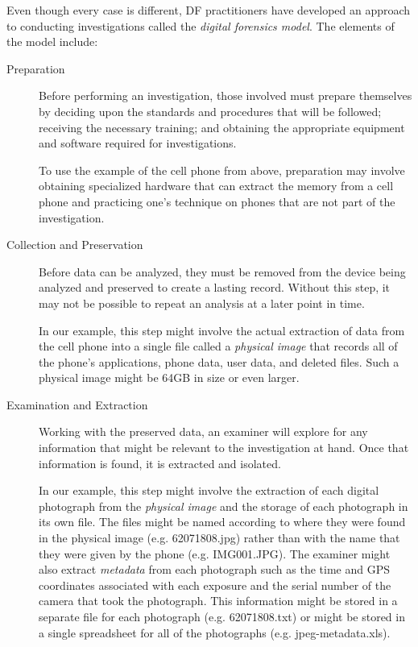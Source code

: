 Even though every case is different, DF practitioners have developed an
approach to conducting investigations called the 
\emph{digital forensics model}\cite{pollitt:models}. The 
elements of the model include:

\begin{description}
\item[Preparation] Before performing an investigation, those involved
  must prepare themselves by deciding upon the standards and
  procedures that will be followed; receiving the necessary training;
  and obtaining the appropriate equipment and software required for
  investigations. 

  To use the example of the cell phone from above,
  preparation may involve obtaining specialized hardware that can extract the
  memory from a cell phone and practicing one's technique on phones that are not part
  of the investigation.

\item[Collection and Preservation]
  Before data can be analyzed, they   must be removed from the
  device being analyzed and preserved to create a lasting
  record. Without this step, it may not be possible to repeat an
  analysis at a later point in time. 

  In our example, this step might involve the actual extraction of data
  from the cell phone into a single file called a \emph{physical
    image} that records all of the phone's applications, phone data, user data,
  and deleted files. Such a physical image might be 64GB in size or
  even larger.

\item[Examination and Extraction] Working with the preserved data, an
  examiner will explore for any information that might be
  relevant to the investigation at hand. Once that information is
  found, it is extracted and isolated.

  In our example, this step might involve the extraction of each
  digital photograph from the \emph{physical image} and the storage of
  each photograph in its own file. The files might be named according
  to where they were found in the physical image (e.g. 62071808.jpg)
  rather than with the name that they were given by the phone
  (e.g. IMG001.JPG). The examiner might also extract \emph{metadata}
  from each photograph such as the time and GPS coordinates associated
  with each exposure and the serial number of the camera that took the
  photograph. This information might be stored in a separate file for
  each photograph (e.g. 62071808.txt) or might be stored in a single
  spreadsheet for all of the photographs (e.g. jpeg-metadata.xls).


\end{description}
